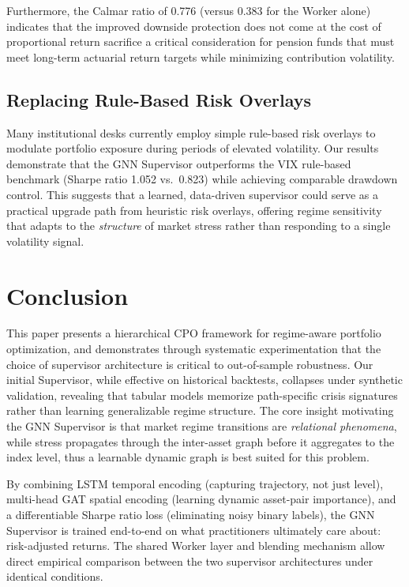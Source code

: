 \documentclass[conferences]{IEEEtran}
\begin{document}
Furthermore, the Calmar ratio of 0.776 (versus 0.383 for the Worker alone) indicates that the improved downside protection does not come at the cost of proportional return sacrifice a critical consideration for pension funds that must meet long-term actuarial return targets while minimizing contribution volatility.

\subsection{Replacing Rule-Based Risk Overlays}
Many institutional desks currently employ simple rule-based risk overlays to modulate portfolio exposure during periods of elevated volatility. Our results demonstrate that the GNN Supervisor outperforms the VIX rule-based benchmark (Sharpe ratio 1.052 vs.\ 0.823) while achieving comparable drawdown control. This suggests that a learned, data-driven supervisor could serve as a practical upgrade path from heuristic risk overlays, offering regime sensitivity that adapts to the \emph{structure} of market stress rather than responding to a single volatility signal.

\section{Conclusion}

This paper presents a hierarchical CPO framework for regime-aware portfolio optimization, and demonstrates through systematic experimentation that the choice of supervisor architecture is critical to out-of-sample robustness. Our initial Supervisor, while effective on historical backtests, collapses under synthetic validation, revealing that tabular models memorize path-specific crisis signatures rather than learning generalizable regime structure. The core insight motivating the GNN Supervisor is that market regime transitions are \emph{relational phenomena}, while stress propagates through the inter-asset graph before it aggregates to the index level, thus a learnable dynamic graph is best suited for this problem.

By combining LSTM temporal encoding (capturing trajectory, not just level), multi-head GAT spatial encoding (learning dynamic asset-pair importance), and a differentiable Sharpe ratio loss (eliminating noisy binary labels), the GNN Supervisor is trained end-to-end on what practitioners ultimately care about: risk-adjusted returns. The shared Worker layer and blending mechanism allow direct empirical comparison between the two supervisor architectures under identical conditions.
\end{document}
